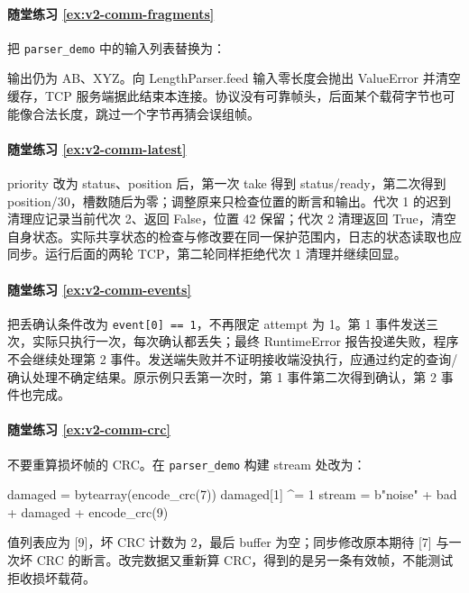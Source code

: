 \paragraph*{随堂练习 \ref{ex:v2-comm-fragments}}
\begin{solution}
把 \texttt{parser\_demo} 中的输入列表替换为：
\begin{tpython}
[b"\x02", b"A", b"B", b"\x03X", b"YZ"]
\end{tpython}
输出仍为 AB、XYZ。向 LengthParser.feed 输入零长度会抛出 ValueError 并清空缓存，TCP 服务端据此结束本连接。协议没有可靠帧头，后面某个载荷字节也可能像合法长度，跳过一个字节再猜会误组帧。
\end{solution}

\paragraph*{随堂练习 \ref{ex:v2-comm-latest}}
\begin{solution}
priority 改为 status、position 后，第一次 take 得到 status/ready，第二次得到 position/30，槽数随后为零；调整原来只检查位置的断言和输出。代次 1 的迟到清理应记录当前代次 2、返回 False，位置 42 保留；代次 2 清理返回 True，清空自身状态。实际共享状态的检查与修改要在同一保护范围内，日志的状态读取也应同步。运行后面的两轮 TCP，第二轮同样拒绝代次 1 清理并继续回显。
\end{solution}

\paragraph*{随堂练习 \ref{ex:v2-comm-events}}
\begin{solution}
把丢确认条件改为 \texttt{event[0] == 1}，不再限定 attempt 为 1。第 1 事件发送三次，实际只执行一次，每次确认都丢失；最终 RuntimeError 报告投递失败，程序不会继续处理第 2 事件。发送端失败并不证明接收端没执行，应通过约定的查询/确认处理不确定结果。原示例只丢第一次时，第 1 事件第二次得到确认，第 2 事件也完成。
\end{solution}

\paragraph*{随堂练习 \ref{ex:v2-comm-crc}}
\begin{solution}
不要重算损坏帧的 CRC。在 \texttt{parser\_demo} 构建 stream 处改为：
\begin{tpython}
damaged = bytearray(encode_crc(7))
damaged[1] ^= 1
stream = b"noise" + bad + damaged + encode_crc(9)
\end{tpython}
值列表应为 [9]，坏 CRC 计数为 2，最后 buffer 为空；同步修改原本期待 [7] 与一次坏 CRC 的断言。改完数据又重新算 CRC，得到的是另一条有效帧，不能测试拒收损坏载荷。
\end{solution}

